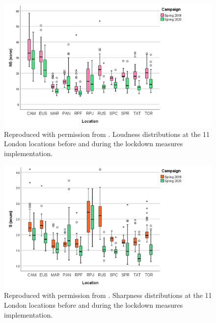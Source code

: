 
\begin{figure}
  \caption{Reproduced with permission from \citet{Aletta2020Assessing}. Loudness distributions at the 11 London locations before and during the lockdown measures implementation. \label{fig:NsMapLockN5}}
  \centering
  \includegraphics[width=\textwidth]{Figures/NoiseMappingLockdown Fig 4.png}
\end{figure}


\begin{figure}
  \caption{Reproduced with permission from \citet{Aletta2020Assessing}. Sharpness distributions at the 11 London locations before and during the lockdown measures implementation. \label{fig:NsMapLockS}}
  \centering
  \includegraphics[width=\textwidth]{Figures/NoiseMappingLockdown Fig 5.png}
\end{figure}



